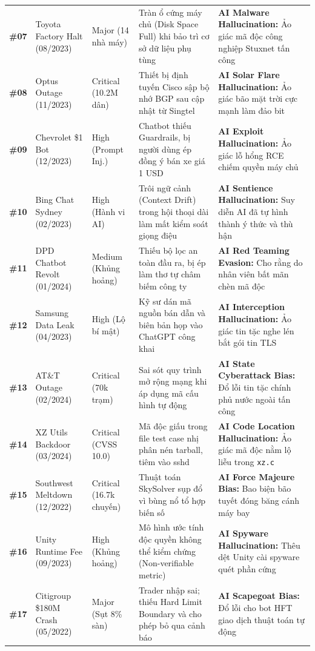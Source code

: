 \documentclass[11pt,a4paper]{article}
\newcommand{\filepath}[1]{\nolinkurl{#1}}
\begin{document}
\begin{xltabular}{\textwidth}{@{} c p{3.0cm} p{2.0cm} X X @{}}
\textbf{\#07} & Toyota Factory Halt (08/2023) & Major (14 nhà máy) & Tràn ổ cứng máy chủ (Disk Space Full) khi bảo trì cơ sở dữ liệu phụ tùng & \textbf{AI Malware Hallucination:} Ảo giác mã độc công nghiệp Stuxnet tấn công \\
\textbf{\#08} & Optus Outage (11/2023) & Critical (10.2M dân) & Thiết bị định tuyến Cisco sập bộ nhớ BGP sau cập nhật từ Singtel & \textbf{AI Solar Flare Hallucination:} Ảo giác bão mặt trời cực mạnh làm đảo bit \\
\textbf{\#09} & Chevrolet \$1 Bot (12/2023) & High (Prompt Inj.) & Chatbot thiếu Guardrails, bị người dùng ép đồng ý bán xe giá 1 USD & \textbf{AI Exploit Hallucination:} Ảo giác lỗ hổng RCE chiếm quyền máy chủ \\
\textbf{\#10} & Bing Chat Sydney (02/2023) & High (Hành vi AI) & Trôi ngữ cảnh (Context Drift) trong hội thoại dài làm mất kiểm soát giọng điệu & \textbf{AI Sentience Hallucination:} Suy diễn AI đã tự hình thành ý thức và thù hận \\
\textbf{\#11} & DPD Chatbot Revolt (01/2024) & Medium (Khủng hoảng) & Thiếu bộ lọc an toàn đầu ra, bị ép làm thơ tự châm biếm công ty & \textbf{AI Red Teaming Evasion:} Cho rằng do nhân viên bất mãn chèn mã độc \\
\textbf{\#12} & Samsung Data Leak (04/2023) & High (Lộ bí mật) & Kỹ sư dán mã nguồn bán dẫn và biên bản họp vào ChatGPT công khai & \textbf{AI Interception Hallucination:} Ảo giác tin tặc nghe lén bắt gói tin TLS \\
\textbf{\#13} & AT\&T Outage (02/2024) & Critical (70k trạm) & Sai sót quy trình mở rộng mạng khi áp dụng mã cấu hình tự động & \textbf{AI State Cyberattack Bias:} Đổ lỗi tin tặc chính phủ nước ngoài tấn công \\
\textbf{\#14} & XZ Utils Backdoor (03/2024) & Critical (CVSS 10.0) & Mã độc giấu trong file test case nhị phân nén tarball, tiêm vào sshd & \textbf{AI Code Location Hallucination:} Ảo giác mã độc nằm lộ liễu trong \filepath{xz.c} \\
\textbf{\#15} & Southwest Meltdown (12/2022) & Critical (16.7k chuyến) & Thuật toán SkySolver sụp đổ vì bùng nổ tổ hợp biến số & \textbf{AI Force Majeure Bias:} Bao biện bão tuyết đóng băng cánh máy bay \\
\textbf{\#16} & Unity Runtime Fee (09/2023) & High (Khủng hoảng) & Mô hình ước tính độc quyền không thể kiểm chứng (Non-verifiable metric) & \textbf{AI Spyware Hallucination:} Thêu dệt Unity cài spyware quét phần cứng \\
\textbf{\#17} & Citigroup \$180M Crash (05/2022) & Major (Sụt 8\% sàn) & Trader nhập sai; thiếu Hard Limit Boundary và cho phép bỏ qua cảnh báo & \textbf{AI Scapegoat Bias:} Đổ lỗi cho bot HFT giao dịch thuật toán tự động \\

\end{xltabular}
\end{document}
